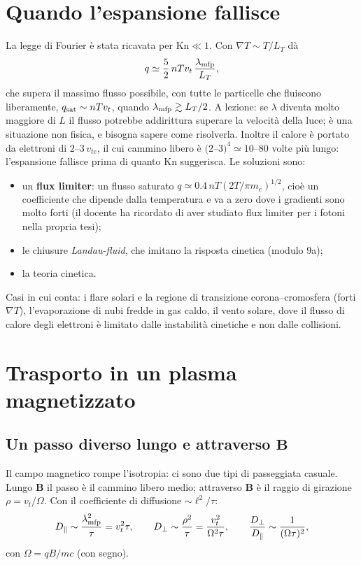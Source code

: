 \section{Quando l'espansione fallisce}
La legge di Fourier è stata ricavata per $\mathrm{Kn}\ll1$. Con $\nabla T\sim T/L_T$ dà
\begin{equation}
q\simeq\frac52\,nTv_t\,\frac{\lambda_{\rm mfp}}{L_T},
\end{equation}
che supera il massimo flusso possibile, con tutte le particelle che fluiscono liberamente, $q_{\rm sat}\sim nTv_t$, quando $\lambda_{\rm mfp}\gtrsim L_T/2$. A lezione: se $\lambda$ diventa molto maggiore di $L$ il flusso potrebbe addirittura superare la velocità della luce; è una situazione non fisica, e bisogna sapere come risolverla.
Inoltre il calore è portato da elettroni di $2$--$3\,v_{te}$, il cui cammino libero è $(2$--$3)^4\simeq10$--$80$ volte più lungo: l'espansione fallisce prima di quanto $\mathrm{Kn}$ suggerisca. Le soluzioni sono:
\begin{itemize}
\item un \textbf{flux limiter}: un flusso saturato $q\simeq0.4\,nT(2T/\pi m_e)^{1/2}$, cioè un coefficiente che dipende dalla temperatura e va a zero dove i gradienti sono molto forti (il docente ha ricordato di aver studiato flux limiter per i fotoni nella propria tesi);
\item le chiusure \emph{Landau-fluid}, che imitano la risposta cinetica (modulo 9a);
\item la teoria cinetica.
\end{itemize}
Casi in cui conta: i flare solari e la regione di transizione corona--cromosfera (forti $\nabla T$), l'evaporazione di nubi fredde in gas caldo, il vento solare, dove il flusso di calore degli elettroni è limitato dalle instabilità cinetiche e non dalle collisioni.

\section{Trasporto in un plasma magnetizzato}
\subsection{Un passo diverso lungo e attraverso $\mathbf{B}$}
Il campo magnetico rompe l'isotropia: ci sono due tipi di passeggiata casuale. Lungo $\mathbf{B}$ il passo è il cammino libero medio; attraverso $\mathbf{B}$ è il raggio di girazione $\rho=v_t/\Omega$. Con il coefficiente di diffusione $\sim\ell^2/\tau$:
\begin{equation}
D_\parallel\sim\frac{\lambda_{\rm mfp}^2}{\tau}=v_t^2\tau,\qquad D_\perp\sim\frac{\rho^2}{\tau}=\frac{v_t^2}{\Omega^2\tau},\qquad\frac{D_\perp}{D_\parallel}\sim\frac{1}{(\Omega\tau)^2},
\end{equation}
con $\Omega=qB/mc$ (con segno).

